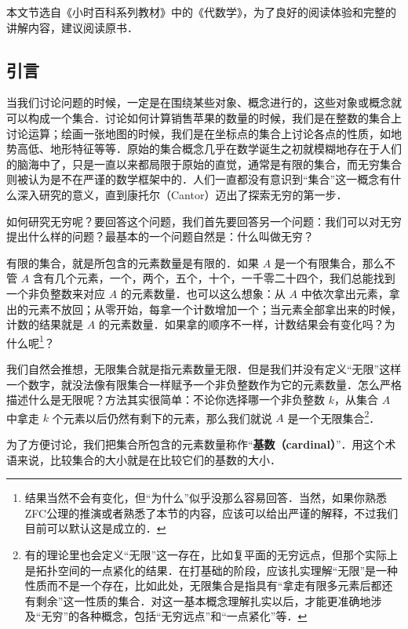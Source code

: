 



本文节选自《小时百科系列教材》中的《代数学》，为了良好的阅读体验和完整的讲解内容，建议阅读原书．

\subsection{引言}

当我们讨论问题的时候，一定是在围绕某些对象、概念进行的，这些对象或概念就可以构成一个集合．讨论如何计算销售苹果的数量的时候，我们是在整数的集合上讨论运算；绘画一张地图的时候，我们是在坐标点的集合上讨论各点的性质，如地势高低、地形特征等等．原始的集合概念几乎在数学诞生之初就模糊地存在于人们的脑海中了，只是一直以来都局限于原始的直觉，通常是有限的集合，而无穷集合则被认为是不在严谨的数学框架中的．人们一直都没有意识到“集合”这一概念有什么深入研究的意义，直到康托尔（Cantor）迈出了探索无穷的第一步．

如何研究无穷呢？要回答这个问题，我们首先要回答另一个问题：我们可以对无穷提出什么样的问题？最基本的一个问题自然是：什么叫做无穷？

有限的集合，就是所包含的元素数量是有限的．如果 $A$ 是一个有限集合，那么不管 $A$ 含有几个元素，一个，两个，五个，十个，一千零二十四个，我们总能找到一个非负整数来对应 $A$ 的元素数量．也可以这么想象：从 $A$ 中依次拿出元素，拿出的元素不放回；从零开始，每拿一个计数增加一个；当元素全部拿出来的时候，计数的结果就是 $A$ 的元素数量．如果拿的顺序不一样，计数结果会有变化吗？为什么呢\footnote{结果当然不会有变化，但“为什么”似乎没那么容易回答．当然，如果你熟悉ZFC公理的推演或者熟悉了本节的内容，应该可以给出严谨的解释，不过我们目前可以默认这是成立的．}？

我们自然会推想，无限集合就是指元素数量无限．但是我们并没有定义“无限”这样一个数字，就没法像有限集合一样赋予一个非负整数作为它的元素数量．怎么严格描述什么是无限呢？方法其实很简单：不论你选择哪一个非负整数 $k$，从集合 $A$ 中拿走 $k$ 个元素以后仍然有剩下的元素，那么我们就说 $A$ 是一个无限集合\footnote{有的理论里也会定义“无限”这一存在，比如复平面的无穷远点，但那个实际上是拓扑空间的一点紧化的结果．在打基础的阶段，应该扎实理解“无限”是一种性质而不是一个存在，比如此处，无限集合是指具有“拿走有限多元素后都还有剩余”这一性质的集合．对这一基本概念理解扎实以后，才能更准确地涉及“无穷”的各种概念，包括“无穷远点”和“一点紧化”等．}．

为了方便讨论，我们把集合所包含的元素数量称作“\textbf{基数（cardinal）}”．用这个术语来说，比较集合的大小就是在比较它们的基数的大小．

